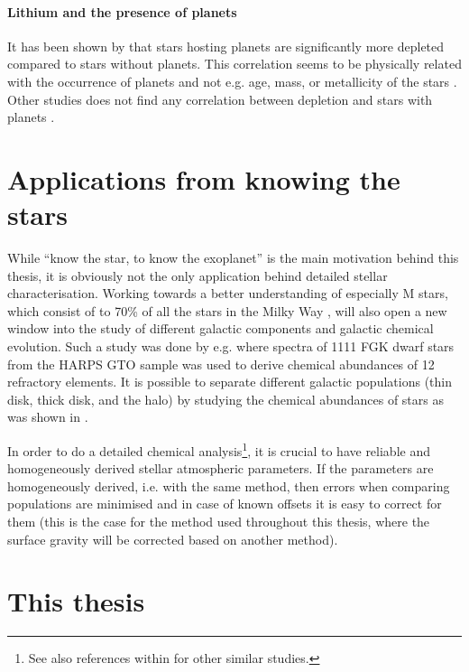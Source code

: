 \paragraph{Lithium and the presence of planets}

It has been shown by \citet{Israelian2004,Delgado2014,Figueira2014a,Gonzalez2015,Takeda2005} that
stars hosting planets are significantly more  depleted compared to stars without planets.
This correlation seems to be physically related with the occurrence of planets and not e.g. age,
mass, or metallicity of the stars \citep{Sousa2010}. Other studies does not find any correlation
between  depletion and stars with planets \citep{Baumann2010,Ramirez2012}.


\section{Applications from knowing the stars}
\label{sec:stars_application}

While ``know the star, to know the exoplanet'' is the main motivation behind this thesis, it is
obviously not the only application behind detailed stellar characterisation. Working towards a
better understanding of especially M stars, which consist of to 70\% of all the stars in the Milky
Way \citep{Bochanski2010}, will also open a new window into the study of different galactic
components and galactic chemical evolution. Such a study was done by e.g.
\citet{Adibekyan2012,Delgado2017} where spectra of 1111 FGK dwarf stars from the HARPS GTO sample
was used to derive chemical abundances of 12 refractory elements. It is possible to separate
different galactic populations (thin disk, thick disk, and the halo) by studying the chemical
abundances of stars as was shown in \citet{Adibekyan2012}.

In order to do a detailed chemical analysis\footnote{See also references within
\citet{Adibekyan2012} for other similar studies.}, it is crucial to have reliable and homogeneously
derived stellar atmospheric parameters. If the parameters are homogeneously derived, i.e. with the
same method, then errors when comparing populations are minimised and in case of known offsets it is
easy to correct for them (this is the case for the method used throughout this thesis, where the
surface gravity will be corrected based on another method).


\section{This thesis}
\label{sec:this_thesis}

